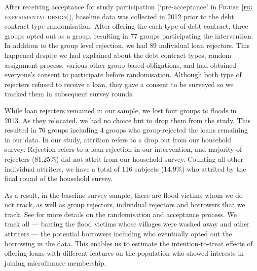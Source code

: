 	After receiving acceptance for study participation (`pre-acceptance' in \textsc{\normalsize Figure \ref{fig experimantal design}}), baseline data was collected in 2012 prior to the debt contract type randomisation. After offering the each type of debt contract, three groups opted out as a group, resulting in 77 groups participating the intervention. In addition to the group level rejection, we had 89 individual loan rejectors. This happened despite we had explained about the debt contract types, random assignment process, various other group based obligations, and had obtained everyone's consent to participate before randomisation. Although both type of rejecters refused to receive a loan, they gave a consent to be surveyed so we tracked them in subsequent survey rounds.

	While loan rejecters remained in our sample, we lost four groups to floods in 2013. As they relocated, we had no choice but to drop them from the study. This resulted in 76 groups including 4 groups who group-rejected the loans remaining in our data. In our study, attrition refers to a drop out from our household survey. Rejection refers to a loan rejection in our intervention, and majority of rejecters (81.25\%) did not attrit from our household survey. Counting all other individual attriters, we have a total of 116 subjects (14.9\%) who attrited by the final round of the household survey. 

	As a result, in the baseline survey sample, there are flood victims whom we do not track, as well as group rejectors, individual rejectors and borrowers that we track. See \citet{GUK2016} for more details on the randomisation and acceptance process. We track all --- barring the flood victims whose villages were washed away and other attriters --- the potential borrowers including who eventually opted out the borrowing in the data. This enables us to estimate the intention-to-treat effects of offering loans with different features on the population who showed interests in joining microfinance membership. 

